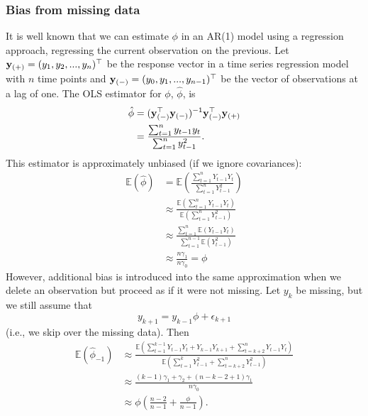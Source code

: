 \subsubsection*{Bias from missing data}

It is well known that we can estimate $\phi$ in an AR(1) model using a regression approach, regressing the current observation on the previous. Let ${\bf y}_{(+)} = (y_1, y_2, ..., y_n)^\top$ be the response vector in a time series regression model with $n$ time points and ${\bf y}_{(-)} = (y_0, y_1, ..., y_{n-1})^\top$ be the vector of observations at a lag of one. The OLS estimator for $\phi$, $\hat \phi$, is
\begin{equation*}
  \begin{aligned}
      \hat \phi &= ({\bf y}_{(-)}^\top {\bf y}_{(-)})^{-1}{\bf y}_{(-)}^\top {\bf y}_{(+)}\\
      &= \frac{\sum_{t=1}^n y_{t-1} y_t}{\sum_{t=1}^n y_{t-1}^2}.
  \end{aligned}
\end{equation*}
This estimator is approximately unbiased (if we ignore covariances):
\begin{equation*}
    \begin{aligned}
        \mathbb{E}(\hat \phi) &= \mathbb{E}\left(\frac{\sum_{t=1}^n Y_{t-1} Y_t}{\sum_{t=1}^n Y_{t-1}^2}\right)\\
        &\approx \frac{\mathbb{E}\left(\sum_{t=1}^n Y_{t-1} Y_t \right)}{\mathbb{E}\left( 
        \sum_{t=1}^n Y_{t-1}^2\right)}\\
        &\approx \frac{\sum_{t=1}^n \mathbb{E}(Y_{t-1} Y_t)}{ 
        \sum_{t=1}^{n-1} \mathbb{E}(Y_{t-1}^2)}\\
        &\approx \frac{n \gamma_1}{n \gamma_0} = \phi
    \end{aligned}
\end{equation*}
However, additional bias is introduced into the same approximation when we delete an observation but proceed as if it were not missing. Let $y_k$ be missing, but we still assume that
\begin{equation*}
    y_{k+1} = y_{k-1}\phi + \epsilon_{k+1}
\end{equation*}
(i.e., we skip over the missing data). Then 
\begin{equation*}
    \begin{aligned}
        \mathbb{E}(\hat \phi_{-1}) &\approx \frac{\mathbb{E}(\sum_{t=1}^{k-1}Y_{t-1}Y_{t} + Y_{k-1}Y_{k+1} + \sum_{t=k+2}^{n} Y_{t-1}Y_t) }{\mathbb{E}(\sum_{t=1}^{k}Y_{t-1}^2 + \sum_{t = k + 2}^n Y_{t-1}^2)}\\
        &\approx \frac{(k - 1) \gamma_1 + \gamma_2 + (n - k - 2 + 1)\gamma_1}{n\gamma_0}\\
        &\approx \phi\left(\frac{n-2}{n - 1} + \frac{\phi}{n - 1} \right).
    \end{aligned}
\end{equation*}
